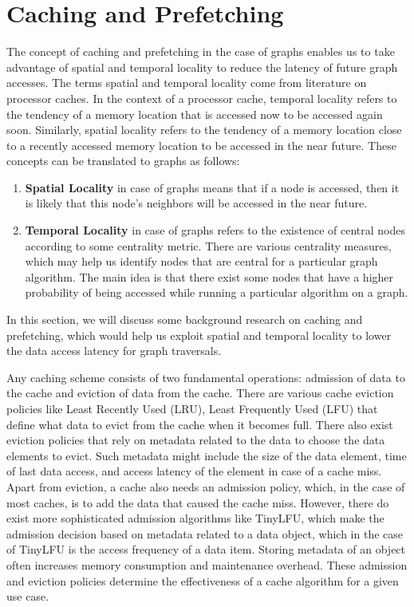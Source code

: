 \section{Caching and Prefetching}\label{sec:cachingDistSys}
The concept of caching and prefetching in the case of graphs enables us to take
advantage of spatial and temporal locality to reduce the latency of future graph
accesses. The terms spatial and temporal locality come from literature on
processor caches. In the context of a processor cache, temporal locality refers
to the tendency of a memory location that is accessed now to be
accessed again soon. Similarly, spatial locality refers to the 
tendency of a memory location close to a recently accessed memory location to be
accessed in the near future. These concepts can be translated to graphs as
follows:
\begin{enumerate}
    \item \textbf{Spatial Locality} in case of graphs means that if a node is
        accessed, then it is likely that this node's neighbors will be accessed
        in the near future.
    \item \textbf{Temporal Locality} in case of graphs refers to the existence
        of central nodes according to some centrality metric. There are
        various centrality measures\cite{klein2010centrality}, which may help us 
        identify nodes that are central for a particular graph algorithm. The
        main idea is that there exist some nodes that have a higher probability
        of being accessed while running a particular algorithm on a graph.
\end{enumerate}
In this section, we will discuss some background research on caching and
prefetching, which would help us exploit  spatial and temporal locality to lower
the data access latency for graph traversals.

\medskip
Any caching scheme consists of two fundamental operations: admission of
data to the cache and eviction of data from the cache. There are various cache
eviction policies like Least Recently Used (LRU), Least Frequently Used (LFU)
that define what data to evict from the cache when it becomes
full. There also exist eviction policies that rely on metadata related to the
data to choose the data elements to evict. Such metadata might
include the size of the data element, time of last data access, and access latency
of the element in case of a cache miss. Apart from eviction, a cache also needs
an admission policy, which, in the case of most caches, is to add the data that
caused the cache miss. However, there do exist more sophisticated
admission algorithms like TinyLFU\cite{einziger2017tinylfu}, which make the
admission decision based on metadata related to a data object, which in the case of
TinyLFU is the access frequency of a data item. Storing metadata of an
object often increases memory consumption and maintenance overhead. These
admission and eviction policies determine the effectiveness of a cache algorithm
for a given use case.

